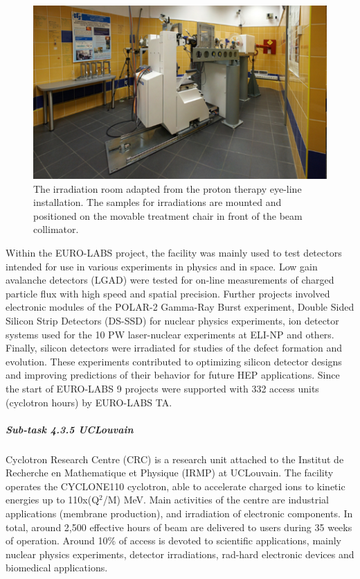 \begin{figure}[!h]
    \centering
    \includegraphics[width=0.75\linewidth]{image10.png}
    \caption{The irradiation room adapted from the proton therapy eye-line installation. The samples for irradiations are mounted and positioned on the movable treatment chair in front of the beam collimator.}
    \label{fig:4.3.4}
\end{figure}

Within the EURO-LABS project, the facility was mainly used to test detectors intended for use in various experiments in physics and in space. Low gain avalanche detectors (LGAD) were tested for on-line measurements of charged particle flux with high speed and spatial precision. Further projects involved electronic modules of the POLAR-2 Gamma-Ray Burst experiment, Double Sided Silicon Strip Detectors (DS-SSD) for nuclear physics experiments, ion detector systems used for the 10 PW laser-nuclear experiments at ELI-NP and others.  Finally, silicon detectors were irradiated for studies of the defect formation and evolution. These experiments contributed to optimizing silicon detector designs and improving predictions of their behavior for future HEP applications.  Since the start of EURO-LABS 9 projects were supported with 332 access units (cyclotron hours) by EURO-LABS TA.

\subparagraph{Sub-task 4.3.5 UCLouvain} \mbox{}

Cyclotron Research Centre (CRC) is a research unit attached to the Institut de Recherche en Mathematique et Physique (IRMP) at UCLouvain. The facility operates the CYCLONE110 cyclotron, able to accelerate charged ions to kinetic energies up to 110x(Q$^2$/M) MeV. Main activities of the centre are industrial applications (membrane production), and irradiation of electronic components. In total, around 2,500 effective hours of beam are delivered to users during 35 weeks of operation. Around 10\% of access is devoted to scientific applications, mainly nuclear physics experiments, detector irradiations, rad-hard electronic devices and biomedical applications.

